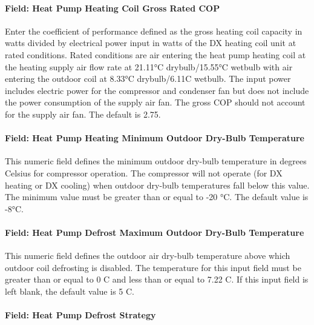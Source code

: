 \paragraph{Field: Heat Pump Heating Coil Gross Rated COP}\label{field-heat-pump-heating-coil-gross-rated-cop-2}

Enter the coefficient of performance defined as the gross heating coil capacity in watts divided by electrical power input in watts of the DX heating coil unit at rated conditions. Rated conditions are air entering the heat pump heating coil at the heating supply air flow rate at 21.11°C drybulb/15.55°C wetbulb with air entering the outdoor coil at 8.33°C drybulb/6.11C wetbulb. The input power includes electric power for the compressor and condenser fan but does not include the power consumption of the supply air fan. The gross COP should not account for the supply air fan. The default is 2.75.

\paragraph{Field: Heat Pump Heating Minimum Outdoor Dry-Bulb Temperature}\label{field-heat-pump-heating-minimum-outdoor-dry-bulb-temperature-1}

This numeric field defines the minimum outdoor dry-bulb temperature in degrees Celsius for compressor operation. The compressor will not operate (for DX heating or DX cooling) when outdoor dry-bulb temperatures fall below this value. The minimum value must be greater than or equal to -20 °C. The default value is -8°C.

\paragraph{Field: Heat Pump Defrost Maximum Outdoor Dry-Bulb Temperature}\label{field-heat-pump-defrost-maximum-outdoor-dry-bulb-temperature-1}

This numeric field defines the outdoor air dry-bulb temperature above which outdoor coil defrosting is disabled. The temperature for this input field must be greater than or equal to 0 C and less than or equal to 7.22 C. If this input field is left blank, the default value is 5 C.

\paragraph{Field: Heat Pump Defrost Strategy}\label{field-heat-pump-defrost-strategy-1}

